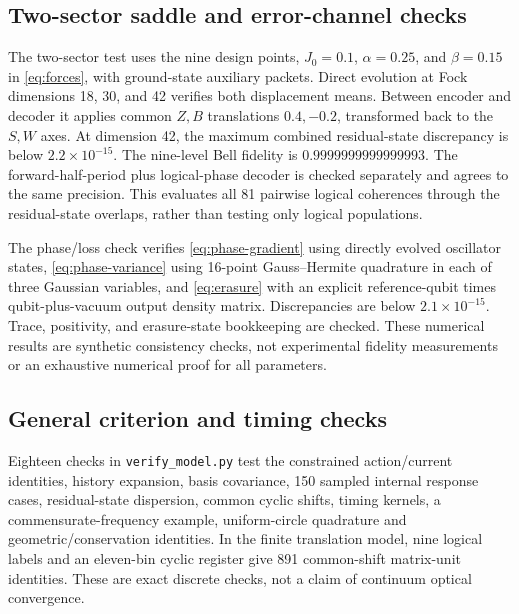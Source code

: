 \documentclass[aip,adv,reprint,onecolumn,amsmath,amssymb]{revtex4-2}
\begin{document}
\subsection{Two-sector saddle and error-channel checks}
The two-sector test uses the nine design points, $J_0=0.1$, $\alpha=0.25$, and $\beta=0.15$ in \eqref{eq:forces}, with ground-state auxiliary packets. Direct evolution at Fock dimensions 18, 30, and 42 verifies both displacement means. Between encoder and decoder it applies common $Z,B$ translations $0.4,-0.2$, transformed back to the $S,W$ axes. At dimension 42, the maximum combined residual-state discrepancy is below $2.2\times10^{-15}$. The nine-level Bell fidelity is $0.9999999999999993$. The forward-half-period plus logical-phase decoder is checked separately and agrees to the same precision. This evaluates all 81 pairwise logical coherences through the residual-state overlaps, rather than testing only logical populations.

The phase/loss check verifies \eqref{eq:phase-gradient} using directly evolved oscillator states, \eqref{eq:phase-variance} using 16-point Gauss--Hermite quadrature in each of three Gaussian variables, and \eqref{eq:erasure} with an explicit reference-qubit times qubit-plus-vacuum output density matrix. Discrepancies are below $2.1\times10^{-15}$. Trace, positivity, and erasure-state bookkeeping are checked. These numerical results are synthetic consistency checks, not experimental fidelity measurements or an exhaustive numerical proof for all parameters.


\subsection{General criterion and timing checks}
Eighteen checks in \texttt{verify\_model.py} test the constrained action/current identities, history expansion, basis covariance, 150 sampled internal response cases, residual-state dispersion, common cyclic shifts, timing kernels, a commensurate-frequency example, uniform-circle quadrature and geometric/conservation identities. In the finite translation model, nine logical labels and an eleven-bin cyclic register give 891 common-shift matrix-unit identities. These are exact discrete checks, not a claim of continuum optical convergence.
\end{document}
